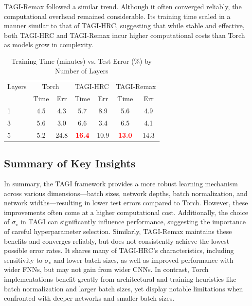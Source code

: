 \documentclass{article}
\begin{document}
TAGI-Remax followed a similar trend. Although it often converged reliably, the computational overhead remained considerable. Its training time scaled in a manner similar to that of TAGI-HRC, suggesting that while stable and effective, both TAGI-HRC and TAGI-Remax incur higher computational costs than Torch as models grow in complexity.

\begin{table}[h]
\centering
\caption{Training Time (minutes) vs. Test Error (\%) by Number of Layers}
\label{tab:training_time}
\begin{small}
\begin{tabular}{lcccccc}
\toprule
Layers & \multicolumn{2}{c}{Torch} & \multicolumn{2}{c}{TAGI-HRC} & \multicolumn{2}{c}{TAGI-Remax} \\
 & Time & Err & Time & Err & Time & Err \\
\midrule
1 & 4.5 & 4.3 & 5.7 & 8.9 & 5.6 & 4.9 \\
3 & 5.6 & 3.0 & 6.6 & 3.4 & 6.5 & 4.1 \\
5 & 5.2 & 24.8 & \textbf{\textcolor{red}{16.4}} & 10.9 & \textbf{\textcolor{red}{13.0}} & 14.3 \\
\bottomrule
\end{tabular}
\end{small}
\end{table}

\subsection{Summary of Key Insights}
In summary, the TAGI framework provides a more robust learning mechanism across various dimensions—batch sizes, network depths, batch normalization, and network widths—resulting in lower test errors compared to Torch. However, these improvements often come at a higher computational cost. Additionally, the choice of $\sigma_v$ in TAGI can significantly influence performance, suggesting the importance of careful hyperparameter selection. Similarly, TAGI-Remax maintains these benefits and converges reliably, but does not consistently achieve the lowest possible error rates. It shares many of TAGI-HRC’s characteristics, including sensitivity to $\sigma_v$ and lower batch sizes, as well as improved performance with wider FNNs, but may not gain from wider CNNs. In contrast, Torch implementations benefit greatly from architectural and training heuristics like batch normalization and larger batch sizes, yet display notable limitations when confronted with deeper networks and smaller batch sizes.
\end{document}
